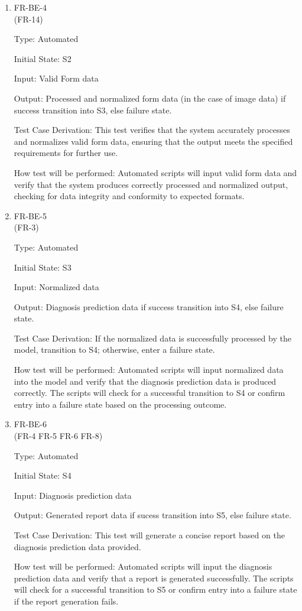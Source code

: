 \documentclass[12pt, titlepage]{article}
\begin{document}
\begin{enumerate}
\item{FR-BE-4\\} (FR-14)

Type: Automated 
					
Initial State: S2
					
Input: Valid Form data
					
Output: Processed and normalized form data (in the case of image data) if success transition into S3, else failure state.

Test Case Derivation: This test verifies that the system accurately processes and normalizes valid form data, ensuring that the output meets the specified requirements for further use.

How test will be performed: Automated scripts will input valid form data and verify that the system produces correctly processed and normalized output, checking for data integrity and conformity to expected formats.

\item{FR-BE-5\\} (FR-3)

Type: Automated
					
Initial State: S3
					
Input: Normalized data
					
Output: Diagnosis prediction data if success transition into S4, else failure state.

Test Case Derivation: If the normalized data is successfully processed by the model, transition to S4; otherwise, enter a failure state.

How test will be performed: Automated scripts will input normalized data into the model and verify that the diagnosis prediction data is produced correctly. The scripts will check for a successful transition to S4 or confirm entry into a failure state based on the processing outcome.

\item{FR-BE-6\\} (FR-4 FR-5 FR-6 FR-8)

Type: Automated 
					
Initial State: S4
					
Input: Diagnosis prediction data
					
Output: Generated report data if sucess transition into S5, else failure state.

Test Case Derivation: This test will generate a concise report based on the diagnosis prediction data provided.

How test will be performed: Automated scripts will input the diagnosis prediction data and verify that a report is generated successfully. The scripts will check for a successful transition to S5 or confirm entry into a failure state if the report generation fails.


\end{enumerate}
\end{document}
